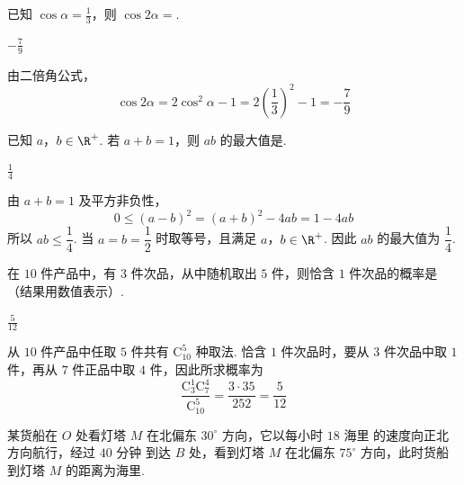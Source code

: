 \begin{problem}
已知 \( \cos\alpha=\frac{1}{3} \)，则 \( \cos2\alpha= \)\fillinblank{}.
\end{problem}

\begin{answer}
\(-\frac{7}{9}\)
\end{answer}

\begin{solution}
由二倍角公式，
\[
\cos2\alpha=2\cos^2\alpha-1=2\left(\frac13\right)^2-1=-\frac79
\]
\end{solution}

\begin{problem}
已知 \(a\)，\(b\in\R^+\). 若 \(a+b=1\)，则 \(ab\) 的最大值是\fillinblank{}.
\end{problem}

\begin{answer}
\(\frac{1}{4}\)
\end{answer}

\begin{solution}
由 \(a+b=1\) 及平方非负性，
\[
0\le(a-b)^2=(a+b)^2-4ab=1-4ab
\]
所以 \(ab\le\dfrac14\). 当 \(a=b=\dfrac12\) 时取等号，且满足 \(a\)，\(b\in\R^+\). 因此 \(ab\) 的最大值为 \(\dfrac14\).
\end{solution}

\begin{problem}
在 \(10\) 件产品中，有 \(3\) 件次品，从中随机取出 \(5\) 件，则恰含 \(1\) 件次品的概率是\fillinblank{}（结果用数值表示）.
\end{problem}

\begin{answer}
\(\frac{5}{12}\)
\end{answer}

\begin{solution}
从 \(10\) 件产品中任取 \(5\) 件共有 \(\mathrm C_{10}^{5}\) 种取法. 恰含 \(1\) 件次品时，要从 \(3\) 件次品中取 \(1\) 件，再从 \(7\) 件正品中取 \(4\) 件，因此所求概率为
\[
\frac{\mathrm C_{3}^{1}\mathrm C_{7}^{4}}{\mathrm C_{10}^{5}}
=\frac{3\cdot35}{252}=\frac5{12}
\]
\end{solution}

\begin{problem}
某货船在 \(O\) 处看灯塔 \(M\) 在北偏东 \(30^{\circ}\) 方向，它以每小时 \(18\text{ 海里}\) 的速度向正北方向航行，经过 \(40\text{ 分钟}\) 到达 \(B\) 处，看到灯塔 \(M\) 在北偏东 \(75^{\circ}\) 方向，此时货船到灯塔 \(M\) 的距离为\fillinblank{}\(\text{海里}\).
\end{problem}

